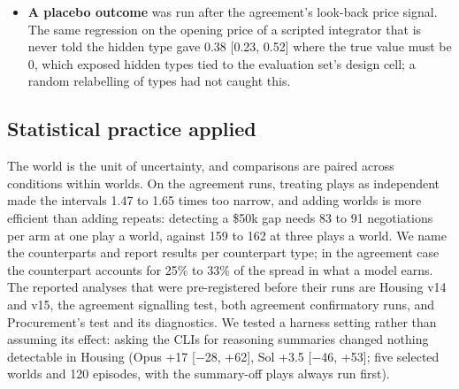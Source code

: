 \begin{itemize}
  the policy seat), and a control may match the reference on at most 10\% of cases. Nine controls played every public
  case, producing 3,468 trajectories with no model: empty, null, full-refund and random legal policies; an
  over-disclosing customer and a first-record customer; a first-sorted intake seat; and a payments seat that moves no
  money. The reference fails the rule on all 11 public cohorts in the policy, customer and payments seats. A full refund
  that collects nothing is fully right on 38 of 180 policy-seat cases, the evidence leaf scores any legal path as
  complete, the customer seat reduces to copying, and the payments seat reduces to how often the answer is no payment.
  Only the intake seat passes.
  These are the original audit's counts. They are not a new lower-control test of the expanded thirteen-cohort
  release or a reanalysis of the model calibration, and neither expansion establishes full quality control.
\item
  \textbf{A placebo outcome} was run after the agreement's look-back price signal. The same regression on the opening price
  of a scripted integrator that is never told the hidden type gave 0.38 {[}0.23, 0.52{]} where the true value must be 0,
  which exposed hidden types tied to the evaluation set's design cell; a random relabelling of types had not caught
  this.
\end{itemize}

\subsection{Statistical practice applied}\label{statistical-practice-applied}

The world is the unit of uncertainty, and comparisons are paired across conditions within worlds. On the agreement
runs, treating plays as independent made the intervals 1.47 to 1.65 times too narrow, and adding worlds is more
efficient than adding repeats: detecting a \$50k gap needs 83 to 91 negotiations per arm at one play a world, against 159
to 162 at three plays a world. We name the counterparts and report results per counterpart type; in the agreement case
the counterpart accounts for 25\% to 33\% of the spread in what a model earns. The reported analyses that were
pre-registered before their runs are Housing v14 and v15, the agreement signalling test, both agreement confirmatory
runs, and Procurement's test and its diagnostics. We tested a harness setting rather than assuming its effect: asking
the CLIs for reasoning summaries changed nothing detectable in Housing (Opus +17 {[}−28, +62{]}, Sol +3.5 {[}−46, +53{]}; five
selected worlds and 120 episodes, with the summary-off plays always run first).

